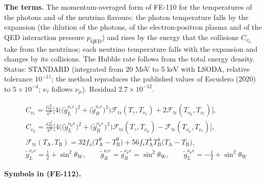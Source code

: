 \documentclass[
  10pt,
]{article}
\begin{document}
\textbf{The terms.} The momentum-averaged form of FE-110 for the
temperatures of the photons and of the neutrino flavours: the photon
temperature falls by the expansion (the dilution of the photons, of the
electron-positron plasma and of the QED interaction pressure
\(p_{\mathrm{QED}}\)) and rises by the energy that the collisions
\(C_{\nu_\alpha}\) take from the neutrinos; each neutrino temperature
falls with the expansion and changes by its collisions. The Hubble rate
follows from the total energy density. Status: STANDARD (integrated from
20 MeV to 5 keV with LSODA, relative tolerance \(10^{-11}\); the method
reproduces the published values of Escudero (2020) to
\(5\times10^{-4}\); \(\nu_\tau\) follows \(\nu_\mu\)). Residual
\(2.7\times10^{-12}\).

\[
\begin{aligned}
&C_{\nu_e} = \frac{G_{\mathrm{F}}^2}{\pi^5}\Big[4\Big(\big(\tilde g^{\nu_e e}_L\big)^2 + \big(\tilde
 g^{\nu_e e}_R\big)^2\Big)
 \mathcal{F}_{\mathrm{tr}}(T_\gamma, T_{\nu_e}) + 2\mathcal{F}_{\mathrm{tr}}(T_{\nu_\mu}, T_{\nu_e})\Big],\\
&C_{\nu_\mu} = \frac{G_{\mathrm{F}}^2}{\pi^5}\Big[4\Big(\big(\tilde g^{\nu_\mu e}_L\big)^2 + \big(\tilde
 g^{\nu_\mu e}_R\big)^2\Big)
 \mathcal{F}_{\mathrm{tr}}(T_\gamma, T_{\nu_\mu}) - \mathcal{F}_{\mathrm{tr}}(T_{\nu_\mu}, T_{\nu_e})\Big],\\
&\mathcal{F}_{\mathrm{tr}}(T_{\mathrm{A}}, T_{\mathrm{B}}) = 32f_{\mathrm{a}}\big(T_{\mathrm{A}}^9 -
 T_{\mathrm{B}}^9\big)
 + 56f_{\mathrm{s}}T_{\mathrm{A}}^4T_{\mathrm{B}}^4\big(T_{\mathrm{A}} - T_{\mathrm{B}}\big),\\
&\tilde g^{\nu_e e}_L = \frac12 + \sin^2\theta_{\mathrm{W}},\qquad \tilde g^{\nu_e e}_R = \tilde
 g^{\nu_\mu e}_R = \sin^2\theta_{\mathrm{W}},
 \qquad \tilde g^{\nu_\mu e}_L = -\frac12 + \sin^2\theta_{\mathrm{W}}
\end{aligned} \tag{FE-112}
\]

\textbf{Symbols in (FE-112).}
\end{document}
